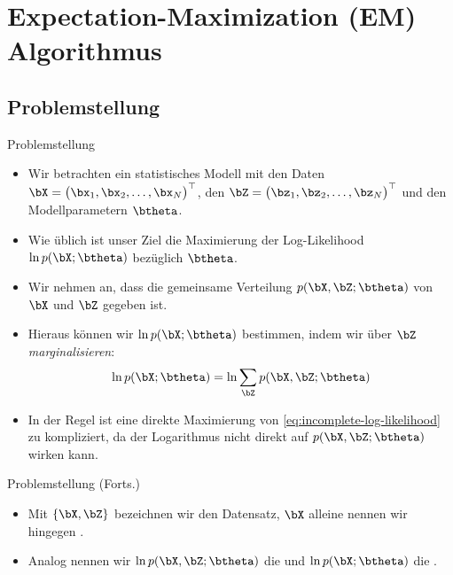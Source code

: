 \section{Expectation-Maximization (EM) Algorithmus}

\divider

\subsection{Problemstellung}

\begin{frame}{Problemstellung}{}
	\begin{itemize}
		\item Wir betrachten ein statistisches Modell mit den Daten $\bX = \bigl( \bx_1, \bx_2, \ldots, \bx_N \bigr)^\top$, den 
			$\bZ = \bigl( \bz_1, \bz_2, \ldots, \bz_N \bigr)^\top$ und den Modellparametern $\btheta$.
		\item Wie üblich ist unser Ziel die Maximierung der Log-Likelihood $\ln p(\bX; \btheta)$ bezüglich $\btheta$.
		\item Wir nehmen an, dass die gemeinsame Verteilung $p(\bX, \bZ; \btheta)$ von $\bX$ und $\bZ$ gegeben ist.
		\item Hieraus können wir $\ln p(\bX; \btheta)$ bestimmen, indem wir über $\bZ$ \textit{marginalisieren}:
		\begin{equation} \label{eq:incomplete-log-likelihood}
			\ln p(\bX; \btheta) = \ln \sum_{\bZ} p(\bX, \bZ; \btheta)
		\end{equation}
		\item In der Regel ist eine direkte Maximierung von \eqref{eq:incomplete-log-likelihood} zu kompliziert,
			da der Logarithmus nicht direkt auf $p(\bX, \bZ; \btheta)$ wirken kann.
	\end{itemize}
\end{frame}


\begin{frame}{Problemstellung (Forts.)}{}
	\begin{itemize}
		\item Mit $\{ \bX, \bZ \}$ bezeichnen wir den  Datensatz, $\bX$ alleine nennen wir hingegen .
		\item Analog nennen wir $\ln p(\bX, \bZ; \btheta)$ die  und $\ln p(\bX; \btheta)$ die
			.
	\end{itemize}
\end{frame}


